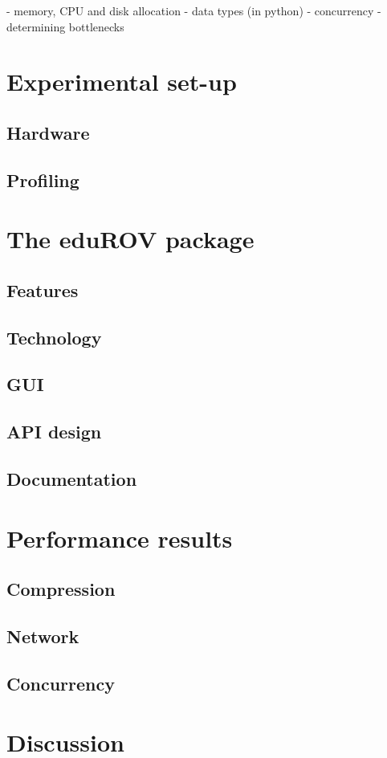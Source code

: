 \documentclass[b5paper,10pt,twoside]{book}
\begin{document}
{{- memory, CPU and disk allocation
- data types (in python)
- concurrency
- determining bottlenecks
}

\chapter{Experimental set-up}
\section{Hardware}

\section{Profiling}

\chapter{The eduROV package}

\section{Features}
\section{Technology}
\section{GUI}
\section{API design}
\section{Documentation}

\chapter{Performance results}
\section{Compression}
\section{Network}
\section{Concurrency}

\chapter{Discussion}

}

{
}
\end{document}

